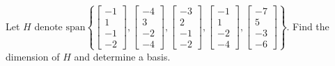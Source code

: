 \documentclass{ximera}
\begin{document}
\begin{problem}\label{prb:5.4} Let $H$ denote $\mbox{span}\left\{ \left[
\begin{array}{r}
-1 \\
1 \\
-1 \\
-2
\end{array}
\right] ,\left[
\begin{array}{r}
-4 \\
3 \\
-2 \\
-4
\end{array}
\right] ,\left[
\begin{array}{r}
-3 \\
2 \\
-1 \\
-2
\end{array}
\right] ,\left[
\begin{array}{r}
-1 \\
1 \\
-2 \\
-4
\end{array}
\right] ,\left[
\begin{array}{r}
-7 \\
5 \\
-3 \\
-6
\end{array}
\right] \right\} .$ Find the dimension of $H$ and determine a basis. \vspace{%
1mm}
\end{problem}
\end{document}
